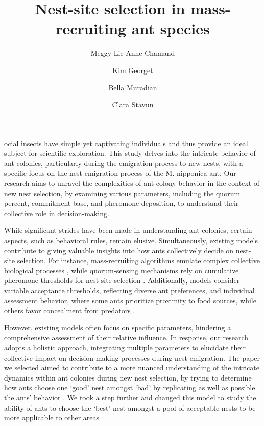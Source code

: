 \documentclass[9pt]{pnas-new}
\title{Nest-site selection in mass-recruiting ant species}
\author{Meggy-Lie-Anne Chamand}
\author{Kim Georget}
\author{Bella Muradian}
\author{Clara Stavun}
\affil{Collective behaviour course research seminar report}
\begin{document}
\verticaladjustment{-2pt}

\maketitle
\thispagestyle{firststyle}

ocial insects have simple yet captivating individuals and thus provide an ideal subject for scientific exploration. This study delves into the intricate behavior of ant colonies, particularly during the emigration process to new nests, with a specific focus on the nest emigration process of the M. nipponica ant. Our research aims to unravel the complexities of ant colony behavior in the context of new nest selection, by examining various parameters, including the quorum percent, commitment base, and pheromone deposition, to understand their collective role in decision-making.

While significant strides have been made in understanding ant colonies, certain aspects, such as behavioral rules, remain elusive. Simultaneously, existing models contribute to giving valuable insights into how ants collectively decide on nest-site selection. For instance, mass-recruiting algorithms emulate complex collective biological processes \cite{computational_model}, while quorum-sensing mechanisms rely on cumulative pheromone thresholds for nest-site selection \cite{quorum_sensing_recruitment}. Additionally, models consider variable acceptance thresholds, reflecting diverse ant preferences, and individual assessment behavior, where some ants prioritize proximity to food sources, while others favor concealment from predators \cite{variability_individual_assessment}.

However, existing models often focus on specific parameters, hindering a comprehensive assessment of their relative influence. In response, our research adopts a holistic approach, integrating multiple parameters to elucidate their collective impact on decision-making processes during nest emigration. The paper we selected aimed to contribute to a more nuanced understanding of the intricate dynamics within ant colonies during new nest selection, by trying to determine how ants choose one ‘good’ nest amongst ‘bad’ by replicating as well as possible the ants' behavior \cite{agent_based_model}. We took a step further and changed this model to study the ability of ants to choose the ‘best’ nest amongst a pool of acceptable nests to be more applicable to other areas   
\end{document}
